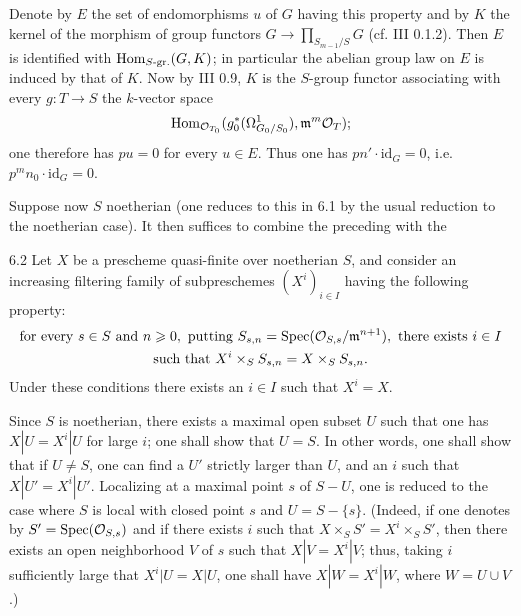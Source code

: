  Denote by $E$ the set of endomorphisms $u$ of $G$ having this property and by $K$ the kernel of the morphism of group functors $G\to\prod_{S_{m-1}/S}G$ (cf. III 0.1.2). Then $E$ is identified with $\operatorname{Hom}_{S\text{-}\mathrm{gr.}}(G,K)$; in particular the abelian group law on $E$ is induced by that of $K$. Now by III 0.9, $K$ is the $S$-group functor associating with every $g:T\to S$ the $k$-vector space
\[
\operatorname{Hom}_{\mathcal{O}_{T_0}}(g_0^*(\Omega^1_{G_0/S_0}),\mathfrak m^m\mathcal{O}_T);
\]
one therefore has $pu=0$ for every $u\in E$. Thus one has $pn'\cdot\mathrm{id}_G=0$, i.e. $p^m n_0\cdot\mathrm{id}_G=0$.

Suppose now $S$ noetherian (one reduces to this in 6.1 by the usual reduction to the noetherian case). It then suffices to combine the preceding with the
\begin{lemma}{6.2}\label{IX.6.2}
Let $X$ be a prescheme quasi-finite over noetherian $S$, and consider an increasing filtering family of subpreschemes $(X^i)_{i\in I}$ having the following property:
\[
\begin{gathered}
\text{for every }s\in S\text{ and }n\geqslant0,\text{ putting }S_{s,n}=\operatorname{Spec}(\mathcal{O}_{S,s}/\mathfrak m^{n+1}),\text{ there exists }i\in I\\
\text{such that }X^i\times_S S_{s,n}=X\times_S S_{s,n}.
\end{gathered}
\]
Under these conditions there exists an $i\in I$ such that $X^i=X$.
\end{lemma}
Since $S$ is noetherian, there exists a maximal open subset $U$ such that one has $X|U=X^i|U$ for large $i$; one shall show that $U=S$. In other words, one shall show that if $U\ne S$, one can find a $U'$ strictly larger than $U$, and an $i$ such that $X|U'=X^i|U'$. Localizing at a maximal point $s$ of $S-U$, one is reduced to the case where $S$ is local with closed point $s$ and $U=S-\{s\}$. (Indeed, if one denotes by $S'=\operatorname{Spec}(\mathcal{O}_{S,s})$ and if there exists $i$ such that $X\times_S S'=X^i\times_S S'$, then there exists an open neighborhood $V$ of $s$ such that $X|V=X^i|V$; thus, taking $i$ sufficiently large that $X^i|U=X|U$, one shall have $X|W=X^i|W$, where $W=U\cup V$.)

